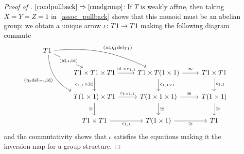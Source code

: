 \documentclass[a4paper,UKenglish,numberwithinsect,cleveref, autoref, thm-restate]{lipics-v2021}
\theoremstyle{plain} %
\theoremstyle{definition} %
\begin{document}
\begin{proof}[Proof of ]
 $\ref{condpullback}\Rightarrow\ref{condgroup}$:
 If $T$ is weakly affine, then taking $X = Y = Z = 1$ in~\eqref{assoc_pullback} shows that this monoid must be an abelian group: we obtain a unique arrow $\iota \colon T1 \to T1$ making the following diagram commute
	\[
		\begin{tikzcd}
			T1 \ar{dr}[description]{(\id,\iota,\id)} \ar[bend left=15]{drr}{(\id,\eta_1 \mathrm{del}_{T1})} \ar[bend right,swap]{ddr}{(\eta_1 \mathrm{del}_{T1},\id)} \\
			&	T1 \times T1 \times T1 \ar{r}{\id \times c_{1,1}} \ar[swap]{d}{c_{1,1} \times \id}	& T1 \times T(1\times 1) \ar{d}{c_{1,1\times 1}} \ar{r}{\cong} & T1\times T1 \ar{d}{c_{1,1}}	\\
			&	T(1\times 1) \times T1 \ar{r}{c_{1\times 1,1}} \ar{d}[swap]{\cong}	& T(1\times 1\times 1) \ar{d}{\cong} \ar{r}{\cong} & T(1\times 1) \ar{d}{\cong} \\
			& T1\times T1 \ar{r}[swap]{c_{1,1}} & T(1\times 1) \ar{r}[swap]{\cong} & T1
		\end{tikzcd}
	\]
	and the commutativity shows that $\iota$ satisfies the equations making it the inversion map for a group structure.
\end{proof}
\end{document}
